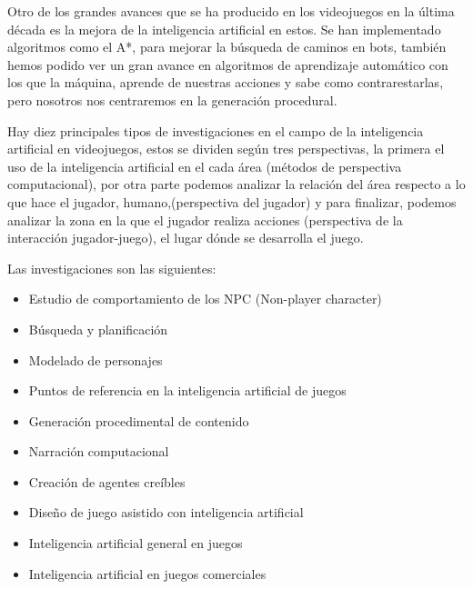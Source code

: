 Otro de los grandes avances que se ha producido en los videojuegos en la última década es la mejora de la inteligencia artificial en estos. Se han implementado algoritmos como el A*, para mejorar la búsqueda de caminos en bots, también hemos podido ver un gran avance en algoritmos de aprendizaje automático con los que la máquina, aprende de nuestras acciones y sabe como contrarestarlas, pero nosotros nos centraremos en la generación procedural.

Hay diez principales tipos de investigaciones en el campo de la inteligencia artificial en videojuegos, estos se dividen según tres perspectivas, la primera el uso de la inteligencia artificial en el cada área (métodos de perspectiva computacional), por otra parte podemos analizar la relación del área respecto a lo que hace el jugador, humano,(perspectiva del jugador) y para finalizar, podemos analizar la zona en la que el jugador realiza acciones (perspectiva de la interacción jugador-juego), el lugar dónde se desarrolla el juego.\cite{B1}


Las investigaciones son las siguientes:

\begin{center}

	\begin{itemize}
	
		\item Estudio de comportamiento de los NPC (Non-player character)\\
		\item Búsqueda y planificación\\
		\item Modelado de personajes\\
		\item Puntos de referencia en la inteligencia artificial de juegos\\
		\item Generación procedimental de contenido\\
		\item Narración computacional\\
		\item Creación de agentes creíbles\\
		\item Diseño de juego asistido con inteligencia artificial\\
		\item Inteligencia artificial general en juegos\\
		\item Inteligencia artificial en juegos comerciales\\
		
	\end{itemize}

\end{center}

